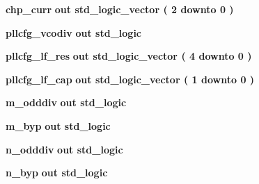 \begin{DoxyCompactItemize}
\item 
{\bf chp\+\_\+curr}  {\bfseries {\bfseries \textcolor{keywordflow}{out}\textcolor{vhdlchar}{ }}} {\bfseries \textcolor{comment}{std\+\_\+logic\+\_\+vector}\textcolor{vhdlchar}{ }\textcolor{vhdlchar}{(}\textcolor{vhdlchar}{ }\textcolor{vhdlchar}{ } \textcolor{vhdldigit}{2} \textcolor{vhdlchar}{ }\textcolor{keywordflow}{downto}\textcolor{vhdlchar}{ }\textcolor{vhdlchar}{ } \textcolor{vhdldigit}{0} \textcolor{vhdlchar}{ }\textcolor{vhdlchar}{)}\textcolor{vhdlchar}{ }} 
\item 
{\bf pllcfg\+\_\+vcodiv}  {\bfseries {\bfseries \textcolor{keywordflow}{out}\textcolor{vhdlchar}{ }}} {\bfseries \textcolor{comment}{std\+\_\+logic}\textcolor{vhdlchar}{ }} 
\item 
{\bf pllcfg\+\_\+lf\+\_\+res}  {\bfseries {\bfseries \textcolor{keywordflow}{out}\textcolor{vhdlchar}{ }}} {\bfseries \textcolor{comment}{std\+\_\+logic\+\_\+vector}\textcolor{vhdlchar}{ }\textcolor{vhdlchar}{(}\textcolor{vhdlchar}{ }\textcolor{vhdlchar}{ } \textcolor{vhdldigit}{4} \textcolor{vhdlchar}{ }\textcolor{keywordflow}{downto}\textcolor{vhdlchar}{ }\textcolor{vhdlchar}{ } \textcolor{vhdldigit}{0} \textcolor{vhdlchar}{ }\textcolor{vhdlchar}{)}\textcolor{vhdlchar}{ }} 
\item 
{\bf pllcfg\+\_\+lf\+\_\+cap}  {\bfseries {\bfseries \textcolor{keywordflow}{out}\textcolor{vhdlchar}{ }}} {\bfseries \textcolor{comment}{std\+\_\+logic\+\_\+vector}\textcolor{vhdlchar}{ }\textcolor{vhdlchar}{(}\textcolor{vhdlchar}{ }\textcolor{vhdlchar}{ } \textcolor{vhdldigit}{1} \textcolor{vhdlchar}{ }\textcolor{keywordflow}{downto}\textcolor{vhdlchar}{ }\textcolor{vhdlchar}{ } \textcolor{vhdldigit}{0} \textcolor{vhdlchar}{ }\textcolor{vhdlchar}{)}\textcolor{vhdlchar}{ }} 
\item 
{\bf m\+\_\+odddiv}  {\bfseries {\bfseries \textcolor{keywordflow}{out}\textcolor{vhdlchar}{ }}} {\bfseries \textcolor{comment}{std\+\_\+logic}\textcolor{vhdlchar}{ }} 
\item 
{\bf m\+\_\+byp}  {\bfseries {\bfseries \textcolor{keywordflow}{out}\textcolor{vhdlchar}{ }}} {\bfseries \textcolor{comment}{std\+\_\+logic}\textcolor{vhdlchar}{ }} 
\item 
{\bf n\+\_\+odddiv}  {\bfseries {\bfseries \textcolor{keywordflow}{out}\textcolor{vhdlchar}{ }}} {\bfseries \textcolor{comment}{std\+\_\+logic}\textcolor{vhdlchar}{ }} 
\item 
{\bf n\+\_\+byp}  {\bfseries {\bfseries \textcolor{keywordflow}{out}\textcolor{vhdlchar}{ }}} {\bfseries \textcolor{comment}{std\+\_\+logic}\textcolor{vhdlchar}{ }} 

\end{DoxyCompactItemize}
